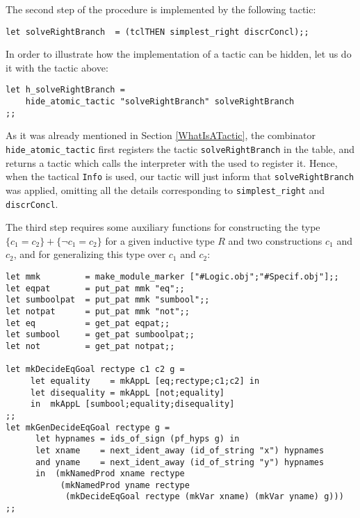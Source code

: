 The second step of the procedure is implemented by the following
tactic:

\begin{verbatim}
let solveRightBranch  = (tclTHEN simplest_right discrConcl);;
\end{verbatim}

In order to illustrate how the implementation of a tactic can be 
hidden, let us do it with the tactic above:

\begin{verbatim}
let h_solveRightBranch =
    hide_atomic_tactic "solveRightBranch" solveRightBranch
;;
\end{verbatim}

As it was already mentioned in Section \ref{WhatIsATactic}, the
combinator \texttt{hide\_atomic\_tactic} first registers the tactic
\texttt{solveRightBranch} in the table, and returns a tactic which
calls the interpreter with the used to register it. Hence, when the
tactical \texttt{Info} is used, our tactic will just inform that
\texttt{solveRightBranch} was applied, omitting all the details
corresponding to \texttt{simplest\_right} and \texttt{discrConcl}.



The third step requires some auxiliary functions for constructing the
type $\{c_1=c_2\}+\{\neg c_1=c_2\}$ for a given inductive type $R$ and
two constructions $c_1$ and $c_2$, and for generalizing this type over
$c_1$ and $c_2$:

\begin{verbatim}
let mmk         = make_module_marker ["#Logic.obj";"#Specif.obj"];;
let eqpat       = put_pat mmk "eq";;                 
let sumboolpat  = put_pat mmk "sumbool";;             
let notpat      = put_pat mmk "not";;   
let eq          = get_pat eqpat;;
let sumbool     = get_pat sumboolpat;;
let not         = get_pat notpat;;

let mkDecideEqGoal rectype c1 c2 g = 
     let equality    = mkAppL [eq;rectype;c1;c2] in
     let disequality = mkAppL [not;equality]
     in  mkAppL [sumbool;equality;disequality]
;;
let mkGenDecideEqGoal rectype g = 
      let hypnames = ids_of_sign (pf_hyps g) in 
      let xname    = next_ident_away (id_of_string "x") hypnames
      and yname    = next_ident_away (id_of_string "y") hypnames
      in  (mkNamedProd xname rectype 
           (mkNamedProd yname rectype 
            (mkDecideEqGoal rectype (mkVar xname) (mkVar yname) g)))
;;
\end{verbatim}

